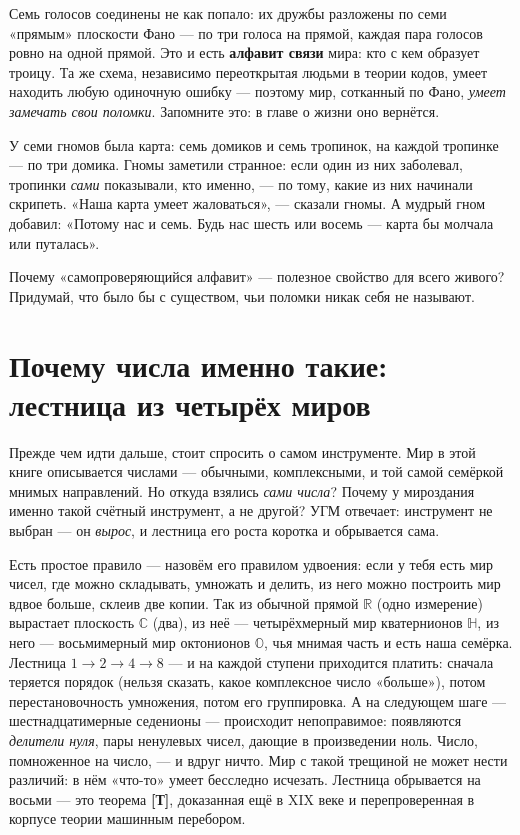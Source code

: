 \documentclass[11pt,letterpaper]{article}
\newcommand{\stT}{\textbf{[Т]}\xspace}
\begin{document}
Семь голосов соединены не как попало: их дружбы разложены по семи
«прямым» плоскости Фано --- по три голоса на прямой, каждая пара
голосов ровно на одной прямой. Это и есть \textbf{алфавит связи} мира:
кто с кем образует троицу. Та же схема, независимо переоткрытая людьми
в теории кодов, умеет находить любую одиночную ошибку --- поэтому
мир, сотканный по Фано, \emph{умеет замечать свои поломки}. Запомните
это: в главе о жизни оно вернётся.

\begin{skazbox}
У семи гномов была карта: семь домиков и семь тропинок, на каждой
тропинке --- по три домика. Гномы заметили странное: если один из них
заболевал, тропинки \emph{сами} показывали, кто именно, --- по тому,
какие из них начинали скрипеть. «Наша карта умеет жаловаться», ---
сказали гномы. А мудрый гном добавил: «Потому нас и семь. Будь нас
шесть или восемь --- карта бы молчала или путалась».
\end{skazbox}

\begin{askbox}
Почему «самопроверяющийся алфавит» --- полезное свойство для всего
живого? Придумай, что было бы с существом, чьи поломки никак себя не
называют.
\end{askbox}

\section{Почему числа именно такие: лестница из четырёх миров}
\label{sec:numbers}

Прежде чем идти дальше, стоит спросить о самом инструменте. Мир в этой
книге описывается числами --- обычными, комплексными, и той самой
семёркой мнимых направлений. Но откуда взялись \emph{сами числа}?
Почему у мироздания именно такой счётный инструмент, а не другой?
УГМ отвечает: инструмент не выбран --- он \emph{вырос}, и лестница
его роста коротка и обрывается сама.

Есть простое правило --- назовём его правилом удвоения: если у тебя
есть мир чисел, где можно складывать, умножать и делить, из него можно
построить мир вдвое больше, склеив две копии. Так из обычной прямой
$\mathbb{R}$ (одно измерение) вырастает плоскость $\mathbb{C}$ (два),
из неё --- четырёхмерный мир кватернионов $\mathbb{H}$, из него ---
восьмимерный мир октонионов $\mathbb{O}$, чья мнимая часть и есть наша
семёрка. Лестница $1 \to 2 \to 4 \to 8$ --- и на каждой ступени
приходится платить: сначала теряется порядок (нельзя сказать, какое
комплексное число «больше»), потом перестановочность умножения, потом
его группировка. А на следующем шаге --- шестнадцатимерные седенионы
--- происходит непоправимое: появляются \emph{делители нуля}, пары
ненулевых чисел, дающие в произведении ноль. Число, помноженное на
число, --- и вдруг ничто. Мир с такой трещиной не может нести
различий: в нём «что-то» умеет бесследно исчезать. Лестница
обрывается на восьми --- это теорема \stT, доказанная ещё в XIX веке
и перепроверенная в корпусе теории машинным перебором.
\end{document}
